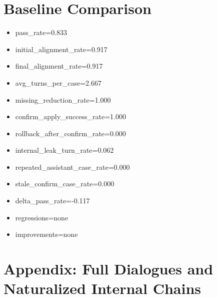 \documentclass[11pt]{ctexart}
\begin{document}
\section{Baseline Comparison}
\begin{itemize}
\item pass\_rate=0.833
\item initial\_alignment\_rate=0.917
\item final\_alignment\_rate=0.917
\item avg\_turns\_per\_case=2.667
\item missing\_reduction\_rate=1.000
\item confirm\_apply\_success\_rate=1.000
\item rollback\_after\_confirm\_rate=0.000
\item internal\_leak\_turn\_rate=0.062
\item repeated\_assistant\_case\_rate=0.000
\item stale\_confirm\_case\_rate=0.000
\item delta\_pass\_rate=-0.117
\item regressions=none
\item improvements=none
\end{itemize}
\appendix
\section{Appendix: Full Dialogues and Naturalized Internal Chains}
\end{document}
